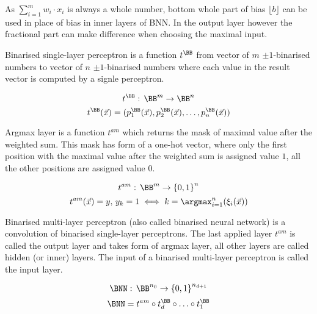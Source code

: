 \begin{remark}
As $\sum_{i=1}^m w_i\cdot x_i$ is always a whole number, bottom whole part of bias
$\lfloor b \rfloor$ can be used in place of bias in inner layers of BNN.\@
In the output layer however the fractional part can make difference when choosing the
maximal input.
\end{remark}

\begin{definition}
Binarised single-layer perceptron is a function $t^\BB$ from vector of $m$ $\pm 1$-binarised numbers
to vector of $n$ $\pm 1$-binarised numbers where each value in the result vector is computed
by a signle perceptron.

\begin{equation*}
    t^\BB: \, \BB^{m} \to \BB^{n}
\end{equation*}
\begin{equation*}
    t^\BB(\vec x) = (p^\BB_{1}(\vec x), p^\BB_{2}(\vec x), \ldots, p^\BB_{n}(\vec x))
\end{equation*}
\end{definition}

\begin{definition}\label{def:argmax}
Argmax layer is a function $t^{am}$ which returns the mask of maximal value after
the weighted sum. This mask has form of a one-hot vector, where only the first
position with the maximal value after the weighted sum is assigned value $1$,
all the other positions are assigned value $0$.

\begin{equation*}
	t^{am}: \, \BB^{m} \to {\{0,1\}}^{n}
\end{equation*}
\begin{equation*}
	t^{am}(\vec x) = y,\, y_k = 1 \iff k = \argmax_{i=1}^n(\xi_i(\vec x))
\end{equation*}
\end{definition}

\begin{definition}
Binarised multi-layer perceptron (also called binarised neural network)
is a convolution of binarised single-layer perceptrons.
The last applied layer $t^{am}$ is called the output layer and takes form of argmax layer,
all other layers are called hidden (or inner)
layers. The input of a binarised multi-layer perceptron is called the input layer.

\begin{equation*}
    \BNN: \, \BB^{n_0} \to {\{0, 1\}}^{n_{d+1}}
\end{equation*}
\begin{equation*}
    \BNN = t^{am} \circ t_d^\BB \circ \ldots \circ t_1^\BB
\end{equation*}
\end{definition}



\sectionsep{}

